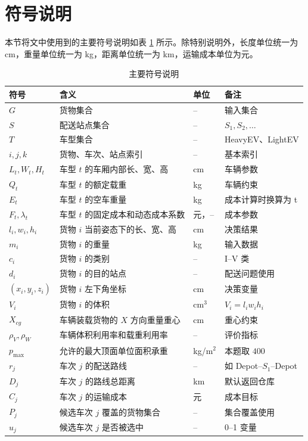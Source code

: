 ﻿\documentclass[UTF8,a4paper,12pt]{ctexart}
\begin{document}
	
	\section{符号说明}
	
	本节将文中使用到的主要符号说明如表 \ref{tab:symbols} 所示。除特别说明外，长度单位统一为 cm，重量单位统一为 kg，距离单位统一为 km，运输成本单位为元。
	
	\begin{table}[H]
		\centering
		\caption{主要符号说明}
		\label{tab:symbols}
		\small
		\begin{tabular}{p{2.2cm} p{7.0cm} p{1.8cm} p{2.9cm}}
			\toprule
			符号 & 含义 & 单位 & 备注 \\
			\midrule
			$G$ & 货物集合 & -- & 输入集合 \\
			$S$ & 配送站点集合 & -- & $S_1,S_2,\ldots$ \\
			$T$ & 车型集合 & -- & HeavyEV、LightEV \\
			$i,j,k$ & 货物、车次、站点索引 & -- & 基本索引 \\
			$L_t,W_t,H_t$ & 车型 $t$ 的车厢内部长、宽、高 & cm & 车辆参数 \\
			$Q_t$ & 车型 $t$ 的额定载重 & kg & 车辆约束 \\
			$E_t$ & 车型 $t$ 的空车重量 & kg & 成本计算时换算为 t \\
			$F_t,\lambda_t$ & 车型 $t$ 的固定成本和动态成本系数 & 元，-- & 成本参数 \\
			
			$l_i,w_i,h_i$ & 货物 $i$ 当前姿态下的长、宽、高 & cm & 决策结果 \\
			$m_i$ & 货物 $i$ 的重量 & kg & 输入数据 \\
			$c_i$ & 货物 $i$ 的类别 & -- & I--V 类 \\
			$d_i$ & 货物 $i$ 的目的站点 & -- & 配送问题使用 \\
			$(x_i,y_i,z_i)$ & 货物 $i$ 左下角坐标 & cm & 决策变量 \\
			$V_i$ & 货物 $i$ 的体积 & cm$^3$ & $V_i=l_iw_ih_i$ \\
			
			$X_{cg}$ & 车辆装载货物的 $X$ 方向重量重心 & cm & 重心约束 \\
			$\rho_V,\rho_W$ & 车辆体积利用率和载重利用率 & -- & 评价指标 \\
			$p_{\max}$ & 允许的最大顶面单位面积承重 & kg/m$^2$ & 本题取 $400$ \\
			
			$r_j$ & 车次 $j$ 的配送路线 & -- & 如 Depot--$S_1$--Depot \\
			$D_j$ & 车次 $j$ 的路线总距离 & km & 默认返回仓库 \\
			$C_j$ & 车次 $j$ 的运输成本 & 元 & 成本目标 \\
			$P_j$ & 候选车次 $j$ 覆盖的货物集合 & -- & 集合覆盖使用 \\
			$u_j$ & 候选车次 $j$ 是否被选中 & -- & 0--1 变量 \\
			

\end{tabular}
\end{table}
\end{document}
